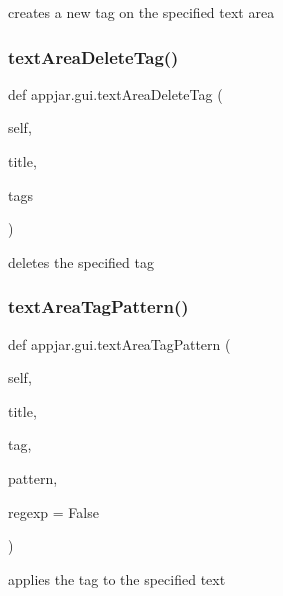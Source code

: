 \begin{DoxyVerb}
\begin{DoxyVerb}creates a new tag on the specified text area \end{DoxyVerb}
 \mbox{\label{classappjar_1_1gui_adc81336f92d4e6b65eb82caad5a6904c}} 
\subsubsection{\texorpdfstring{text\+Area\+Delete\+Tag()}{textAreaDeleteTag()}}
{\footnotesize\ttfamily def appjar.\+gui.\+text\+Area\+Delete\+Tag (\begin{DoxyParamCaption}\item[{}]{self,  }\item[{}]{title,  }\item[{}]{tags }\end{DoxyParamCaption})}

\begin{DoxyVerb}deletes the specified tag \end{DoxyVerb}
 \mbox{\label{classappjar_1_1gui_afc40e24a8057d23cc3f5b5c360c5fe10}} 
\subsubsection{\texorpdfstring{text\+Area\+Tag\+Pattern()}{textAreaTagPattern()}}
{\footnotesize\ttfamily def appjar.\+gui.\+text\+Area\+Tag\+Pattern (\begin{DoxyParamCaption}\item[{}]{self,  }\item[{}]{title,  }\item[{}]{tag,  }\item[{}]{pattern,  }\item[{}]{regexp = {\ttfamily False} }\end{DoxyParamCaption})}

\begin{DoxyVerb}applies the tag to the specified text \end{DoxyVerb}
 \mbox{\label{classappjar_1_1gui_a6c7976fea10348f7a82f98bb8490d390}} 

\end{DoxyVerb}
